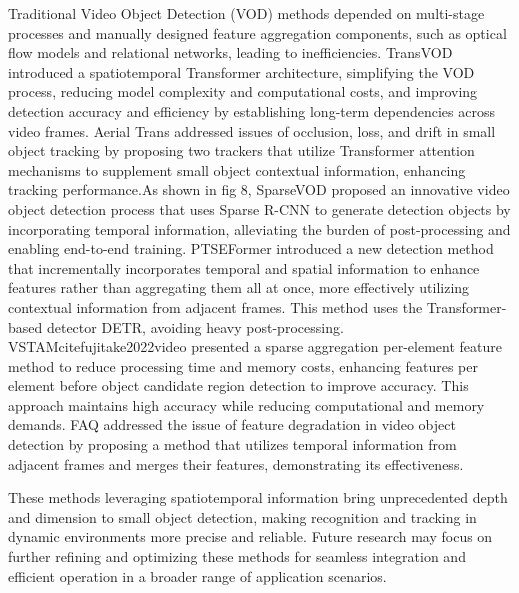 \documentclass[journal]{IEEEtran}
\begin{document}
Traditional Video Object Detection (VOD) methods depended on multi-stage processes and manually designed feature aggregation components, such as optical flow models and relational networks, leading to inefficiencies. TransVOD\cite{zhou2022transvod} introduced a spatiotemporal Transformer architecture, simplifying the VOD process, reducing model complexity and computational costs, and improving detection accuracy and efficiency by establishing long-term dependencies across video frames. Aerial Trans\cite{liu2021aerial} addressed issues of occlusion, loss, and drift in small object tracking by proposing two trackers that utilize Transformer attention mechanisms to supplement small object contextual information, enhancing tracking performance.As shown in fig 8, SparseVOD\cite{hashmi2022spatio} proposed an innovative video object detection process that uses Sparse R-CNN to generate detection objects by incorporating temporal information, alleviating the burden of post-processing and enabling end-to-end training. PTSEFormer\cite{wang2022ptseformer} introduced a new detection method that incrementally incorporates temporal and spatial information to enhance features rather than aggregating them all at once, more effectively utilizing contextual information from adjacent frames. This method uses the Transformer-based detector DETR, avoiding heavy post-processing. VSTAMcite{fujitake2022video} presented a sparse aggregation per-element feature method to reduce processing time and memory costs, enhancing features per element before object candidate region detection to improve accuracy. This approach maintains high accuracy while reducing computational and memory demands. FAQ\cite{cui2023faq} addressed the issue of feature degradation in video object detection by proposing a method that utilizes temporal information from adjacent frames and merges their features, demonstrating its effectiveness.

These methods leveraging spatiotemporal information bring unprecedented depth and dimension to small object detection, making recognition and tracking in dynamic environments more precise and reliable. Future research may focus on further refining and optimizing these methods for seamless integration and efficient operation in a broader range of application scenarios.
\end{document}
